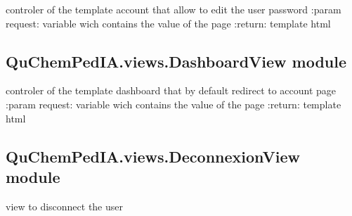 \documentclass[letterpaper,10pt,english]{sphinxmanual}
\begin{document}
\begin{fulllineitems}
\label{\detokenize{QuChemPedIA.views:QuChemPedIA.views.ChangePasswordView.password}}
controler of the template account that allow to edit the user password
:param request: variable wich contains the value of the page
:return: template html

\end{fulllineitems}



\subsection{QuChemPedIA.views.DashboardView module}
\label{\detokenize{QuChemPedIA.views:module-QuChemPedIA.views.DashboardView}}\label{\detokenize{QuChemPedIA.views:quchempedia-views-dashboardview-module}}

\begin{fulllineitems}
\label{\detokenize{QuChemPedIA.views:QuChemPedIA.views.DashboardView.dashboard}}
controler of the template dashboard that by default redirect to account page
:param request: variable wich contains the value of the page
:return: template html

\end{fulllineitems}



\subsection{QuChemPedIA.views.DeconnexionView module}
\label{\detokenize{QuChemPedIA.views:module-QuChemPedIA.views.DeconnexionView}}\label{\detokenize{QuChemPedIA.views:quchempedia-views-deconnexionview-module}}

\begin{fulllineitems}
\label{\detokenize{QuChemPedIA.views:QuChemPedIA.views.DeconnexionView.deconnexion}}
view to disconnect the user

\end{fulllineitems}
\end{document}
